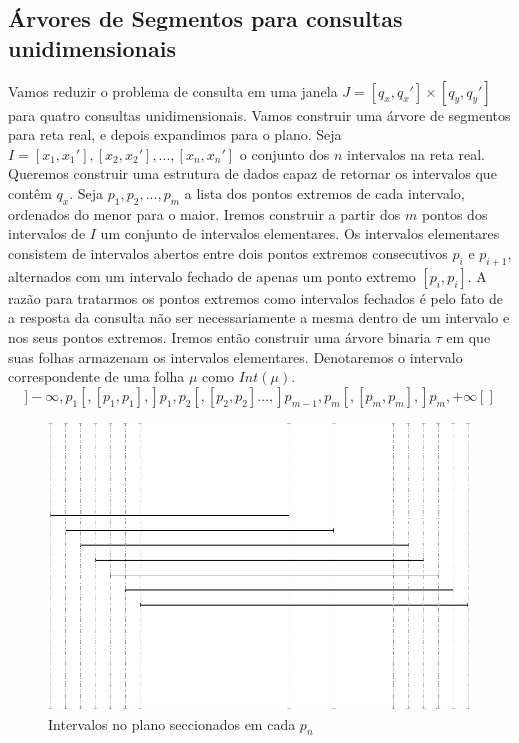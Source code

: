 \subsection{Árvores de Segmentos para consultas unidimensionais}

Vamos %
reduzir o problema de consulta em uma janela $J = [q_x, q_x'] \times [q_y, q_y']$ para quatro consultas unidimensionais. Vamos construir uma árvore de segmentos para reta real, e depois expandimos para o plano. Seja $I={[x_1, x_1'], [x_2, x_2'], ... , [x_n, x_n'] }$ o conjunto dos $n$ intervalos na reta real. Queremos construir uma estrutura de dados capaz de retornar os intervalos que contêm $q_x$. Seja $p_1, p_2, ..., p_m$ a lista dos pontos extremos de cada intervalo, ordenados do menor para o maior. Iremos construir a partir dos $m$ pontos dos intervalos de $I$ um conjunto de intervalos elementares. Os intervalos elementares consistem de intervalos abertos entre dois pontos extremos consecutivos $p_i$ e $p_{i+1}$, alternados com um intervalo fechado de apenas um ponto extremo $[p_i, p_i]$. A razão para tratarmos os pontos extremos como intervalos fechados é pelo fato de a resposta da consulta não ser necessariamente a mesma dentro de um intervalo e nos seus pontos extremos. Iremos então construir uma árvore binaria $\tau$ em que suas folhas armazenam os intervalos elementares. Denotaremos o intervalo correspondente de uma folha $\mu$ como $Int(\mu)$.
\[
    ]-\infty, p_1[, [p_1, p_1], ]p_1, p_2[, [p_2, p_2] ... , ]p_{m-1}, p_m[, [p_m, p_m], ]p_m, +\infty [] 
\]

\begin{figure}[h!]
    \centering
    \includegraphics[scale=0.4]{images/elementary_segments.pdf}
    \caption{Intervalos no plano seccionados em cada $p_n$ }
    \label{fig:intervals_sected}
\end{figure}

